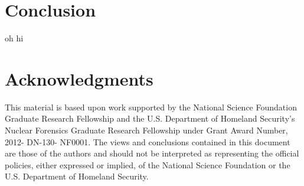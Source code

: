 \documentclass{anstrans}
\begin{document}
\section{Conclusion}
oh hi

\section{Acknowledgments} This material is based upon work supported by the
National Science Foundation Graduate Research Fellowship and the U.S.
Department of Homeland Security's Nuclear Forensics Graduate Research
Fellowship under Grant Award Number, 2012- DN-130- NF0001. The views and
conclusions contained in this document are those of the authors and should not
be interpreted as representing the official policies, either expressed or
implied, of the National Science Foundation or the U.S. Department of Homeland
Security.



\end{document}
